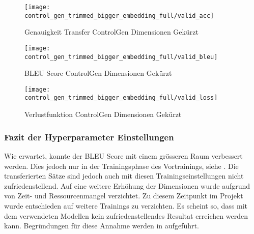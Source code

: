 \begin{figure}[H]
    \centering
    \texttt{[image: control\_gen\_trimmed\_bigger\_embedding\_full/valid\_acc]}
    \caption{Genauigkeit Transfer ControlGen Dimensionen \flqq Gekürzt\frqq}\label{fig:control_gen_trimmed_bigger_embedding_full_valid_acc}
\end{figure}

\begin{figure}[H]
    \centering
    \texttt{[image: control\_gen\_trimmed\_bigger\_embedding\_full/valid\_bleu]}
    \caption{BLEU Score ControlGen Dimensionen \flqq Gekürzt\frqq}\label{fig:control_gen_trimmed_bigger_embedding_full_valid_bleu}
\end{figure}

\begin{figure}[H]
    \centering
    \texttt{[image: control\_gen\_trimmed\_bigger\_embedding\_full/valid\_loss]}
    \caption{Verlustfunktion ControlGen Dimensionen \flqq Gekürzt\frqq}\label{fig:control_gen_trimmed_bigger_embedding_full_valid_loss}
\end{figure}

\subsubsection{Fazit der Hyperparameter Einstellungen}
Wie erwartet, konnte der \gls{BLEU} Score mit einem grösseren Raum verbessert werden. Dies jedoch nur in der
Trainingsphase des Vortrainings, siehe . Die transferierten Sätze sind jedoch auch mit diesen
Trainingseinstellungen nicht zufriedenstellend. Auf eine weitere Erhöhung der Dimensionen wurde aufgrund von Zeit- und
Ressourcenmangel verzichtet. Zu diesem Zeitpunkt im Projekt wurde entschieden auf weitere Trainings zu verzichten. Es
scheint so, dass mit dem verwendeten Modellen kein zufriedenstellendes Resultat erreichen werden kann. Begründungen für
diese Annahme werden in  aufgeführt.

